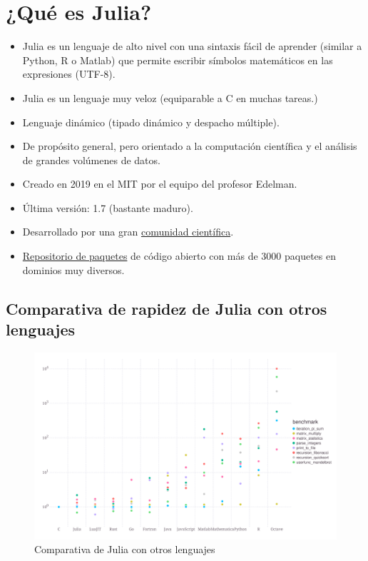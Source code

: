 \documentclass[
  letterpaper,
  DIV=11,
  numbers=noendperiod]{scrreprt}
\providecommand{\tightlist}{%
  \setlength{\itemsep}{0pt}\setlength{\parskip}{0pt}}\usepackage{longtable,booktabs,array}
\begin{document}
\hypertarget{quuxe9-es-julia}{%
\section{¿Qué es Julia?}\label{quuxe9-es-julia}}

\begin{itemize}
\tightlist
\item
  Julia es un lenguaje de alto nivel con una sintaxis fácil de aprender
  (similar a Python, R o Matlab) que permite escribir símbolos
  matemáticos en las expresiones (UTF-8).
\item
  Julia es un lenguaje muy veloz (equiparable a C en muchas tareas.)
\item
  Lenguaje dinámico (tipado dinámico y despacho múltiple).
\item
  De propósito general, pero orientado a la computación científica y el
  análisis de grandes volúmenes de datos.
\item
  Creado en 2019 en el MIT por el equipo del profesor Edelman.
\item
  Última versión: 1.7 (bastante maduro).
\item
  Desarrollado por una gran
  \href{https://julialang.org/community/}{comunidad científica}.
\item
  \href{https://julialang.org/packages/}{Repositorio de paquetes} de
  código abierto con más de 3000 paquetes en dominios muy diversos.
\end{itemize}

\hypertarget{comparativa-de-rapidez-de-julia-con-otros-lenguajes}{%
\subsection{Comparativa de rapidez de Julia con otros
lenguajes}\label{comparativa-de-rapidez-de-julia-con-otros-lenguajes}}

\begin{figure}

{\centering \includegraphics{././img/benchmarks.svg}

}

\caption{Comparativa de Julia con otros lenguajes}

\end{figure}
\end{document}

